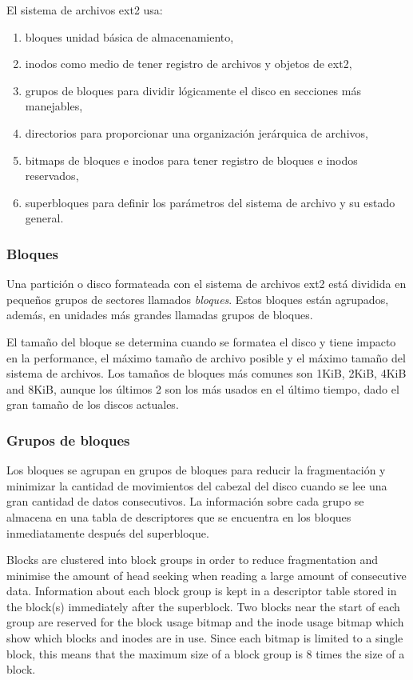 El sistema de archivos ext2 usa:
\begin{enumerate}
  \item bloques unidad básica de almacenamiento,
  \item inodos como medio de tener registro de archivos y objetos de ext2,
  \item  grupos de bloques para dividir lógicamente el disco en secciones más manejables,
  \item directorios para proporcionar una organización jerárquica de archivos,
  \item bitmaps de bloques e inodos para tener registro de bloques e inodos reservados,
  \item superbloques para definir los parámetros del sistema de archivo y su estado general.
\end{enumerate}

\subsubsection{Bloques}
Una partición o disco formateada con el sistema de archivos ext2 está dividida en pequeños grupos de sectores llamados \emph{bloques}. Estos bloques están agrupados, además, en unidades más grandes llamadas grupos de bloques.

El tamaño del bloque se determina cuando se formatea el disco y tiene impacto en la performance, el máximo tamaño de archivo posible y el máximo tamaño del sistema de archivos. Los tamaños de bloques más comunes son 1KiB, 2KiB, 4KiB and 8KiB, aunque los últimos 2 son los más usados en el último tiempo, dado el gran tamaño de los discos actuales.

\subsubsection{Grupos de bloques}

Los bloques se agrupan en grupos de bloques para reducir la fragmentación y minimizar la cantidad de movimientos del cabezal del disco cuando se lee una gran cantidad de datos consecutivos. La información sobre cada grupo se almacena en una tabla de descriptores que se encuentra en los bloques inmediatamente después del superbloque. 

Blocks are clustered into block groups in order to reduce fragmentation and minimise the amount of head seeking when reading a large amount of consecutive data. Information about each block group is kept in a descriptor table stored in the block(s) immediately after the superblock. Two blocks near the start of each group are reserved for the block usage bitmap and the inode usage bitmap which show which blocks and inodes are in use. Since each bitmap is limited to a single block, this means that the maximum size of a block group is 8 times the size of a block.

